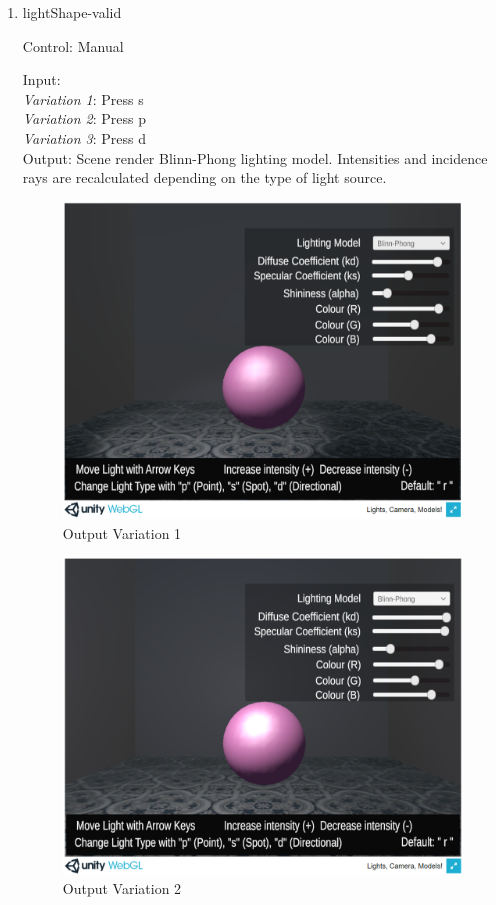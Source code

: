 \documentclass[12pt, titlepage]{article}
\begin{document}
\begin{enumerate}
	

	\item[\label{test:lightShape}]{lightShape-valid\\}
	
	Control: Manual
	
	Input: \\
	\textit{Variation 1}: Press s\\
	\textit{Variation 2}: Press p\\
	\textit{Variation 3}: Press d\\
	
	Output: Scene render Blinn-Phong lighting model. Intensities and incidence 
	rays are recalculated depending on the type of light source.
	
	\begin{figure}[h]
		\centering
		\includegraphics[scale=0.25]{./images/fromVnVPlan/sphere-lit-blinnphong}
		\caption{Output Variation 1}
		\label{fig:spotlight}
	\end{figure}	
	
	\begin{figure}[h]
		\centering
		\includegraphics[scale=0.25]{./images/fromVnVPlan/sphere-lit-blinnphong-point}
		\caption{Output Variation 2}
		\label{fig:point}
	\end{figure}	
	

\end{enumerate}
\end{document}
